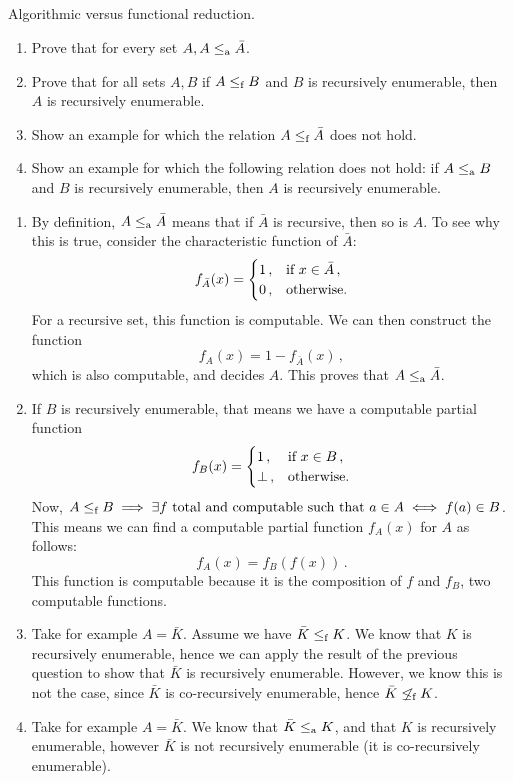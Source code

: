 \subsection{} %
Algorithmic versus functional reduction.
\begin{enumerate}
	\item Prove that for every set \(A, A \le_\textnormal{a} \bar{A}\).
	\item Prove that for all sets \(A, B\) if \(A \le_\textnormal{f} B\)
	and \(B\) is recursively enumerable,
	then \(A\) is recursively enumerable.
	\item Show an example for which the relation \(A \le_\textnormal{f} \bar{A}\)
	does not hold.
	\item Show an example for which the following relation does not hold:
	if \(A \le_\textnormal{a} B\) and \(B\) is recursively enumerable,
	then \(A\) is recursively enumerable.
\end{enumerate}

\begin{solution}
	\begin{enumerate}
		\item By definition, \(A \le_\textnormal{a} \bar{A}\)
		means that if \(\bar{A}\) is recursive, then so is \(A\).
		To see why this is true,
		consider the characteristic function of \(\bar{A}\):
		\[
		f_{\bar{A}}(x) = \begin{cases} 1\,, & \textnormal{if } x\in \bar{A}\,,\\ 0\,, & \textnormal{otherwise.}\end{cases}
		\]
		For a recursive set, this function is computable.
		We can then construct the function
		\[
		f_A(x) = 1 - f_{\bar{A}}(x)\,,
		\]
		which is also computable,
		and decides \(A\).
		This proves that \(A \le_\textnormal{a} \bar{A}\).
		\item If \(B\) is recursively enumerable,
		that means we have a computable partial function
		\[
		f_B(x) = \begin{cases} 1\,, & \textnormal{if } x\in B\,,\\ \bot\,, & \textnormal{otherwise.}\end{cases}
		\]
		Now,
		\(A \le_\textnormal{f} B \implies \exists f \textnormal{ total and computable such that } a \in A \iff f(a) \in B\).
		This means we can find a computable partial function \(f_A(x)\)
		for \(A\) as follows:
		\[
		f_A(x) = f_B(f(x))\,.
		\]
		This function is computable because it is the composition
		of \(f\) and \(f_B\), two computable functions.
		\item Take for example \(A = \bar{K}\).
		Assume we have \(\bar{K} \le_\textnormal{f} K\).
		We know that \(K\) is recursively enumerable,
		hence we can apply the result of the previous question
		to show that \(\bar{K}\) is recursively enumerable.
		However, we know this is not the case,
		since \(\bar{K}\) is co-recursively enumerable,
		hence \(\bar{K} \centernot\fred K\).
		\item Take for example \(A = \bar{K}\).
		We know that \(\bar{K} \le_\textnormal{a} K\),
		and that \(K\) is recursively enumerable,
		however \(\bar{K}\) is not recursively enumerable
		(it is co-recursively enumerable).
	\end{enumerate}
\end{solution}

